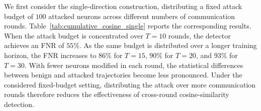 
We first consider the single-direction construction, distributing a fixed attack budget of $100$ attacked neurons across different numbers of communication rounds. Table~\ref{tab:cumulative_cosine_single} reports the corresponding results. When the attack budget is concentrated over $T=10$ rounds, the detector achieves an FNR of $55\%$. As the same budget is distributed over a longer training horizon, the FNR increases to $86\%$ for $T=15$, $90\%$ for $T=20$, and $93\%$ for $T=30$. With fewer neurons modified in each round, the statistical differences between benign and attacked trajectories become less pronounced. Under the considered fixed-budget setting, distributing the attack over more communication rounds therefore reduces the effectiveness of cross-round cosine-similarity detection.


